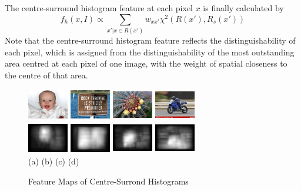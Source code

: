 \documentclass[10pt,twocolumn,letterpaper]{article}
\newcommand{\SUM}{\sum\limits}
\newcommand{\hs}{\hspace{0.58in}}
\begin{document}
The centre-surround histogram feature at each pixel $x$ is finally calculated by $$f_h(x,I)\propto\SUM_{x'|x\in R(x')}w_{xx'}\chi^2(R(x'),R_s(x'))$$
Note that the centre-surround histogram feature reflects the distinguishability of each pixel, which is assigned from the distinguishability of the most outstanding area centred at each pixel of one image, with the weight of spatial closeness to the centre of that area. 

\begin{figure}[h]
    \begin{center}
    \includegraphics[width=0.7in,height=0.54in]{./Figures/CSH_image/1orig.jpg}
    \includegraphics[width=0.7in,height=0.54in]{./Figures/CSH_image/2orig.jpg}
    \includegraphics[width=0.7in,height=0.54in]{./Figures/CSH_image/3orig.jpg}
    \includegraphics[width=0.7in,height=0.54in]{./Figures/CSH_image/4orig.jpg}\\
    \includegraphics[width=0.7in,height=0.54in]{./Figures/CSH_image/1cont.jpg}
    \includegraphics[width=0.7in,height=0.54in]{./Figures/CSH_image/2cont.jpg}
    \includegraphics[width=0.7in,height=0.54in]{./Figures/CSH_image/3cont.jpg}
    \includegraphics[width=0.7in,height=0.54in]{./Figures/CSH_image/4cont.jpg}\\
    \footnotesize \hspace{0.1cm} (a) \hs (b) \hs  (c) \hs (d) \\
    \caption{Feature Maps of Centre-Surrond Histograms} \label{Fig:RegionalFeatureMap}
    \end{center}
\end{figure}
\end{document}
